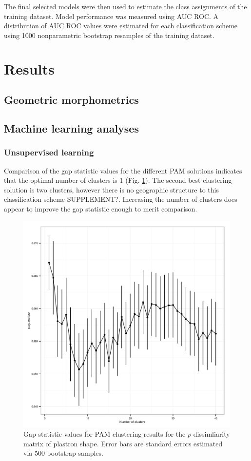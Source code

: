 \documentclass[12pt]{article}\usepackage{graphicx, color}
\begin{document}
The final selected models were then used to estimate the class assignments of the training dataset. Model performance was measured using AUC ROC. A distribution of AUC ROC values were estimated for each classification scheme using 1000 nonparametric bootstrap resamples of the training dataset.

\section{Results}
\subsection{Geometric morphometrics}

\subsection{Machine learning analyses}
\subsubsection{Unsupervised learning}

Comparison of the gap statistic values for the different PAM solutions indicates that the optimal number of clusters is 1 (Fig. \ref{fig:gap}). The second best clustering solution is two clusters, however there is no geographic structure to this classification scheme SUPPLEMENT?. Increasing the number of clusters does appear to improve the gap statistic enough to merit comparison.

\begin{figure}[ht]
  \centering
  \includegraphics[width = \textwidth]{figure/gap_res}
  \caption{Gap statistic values for PAM clustering results for the \(\rho\) dissimliarity matrix of plastron shape. Error bars are standard errors estimated via 500 bootstrap samples.}
  \label{fig:gap}
\end{figure}
\end{document}
